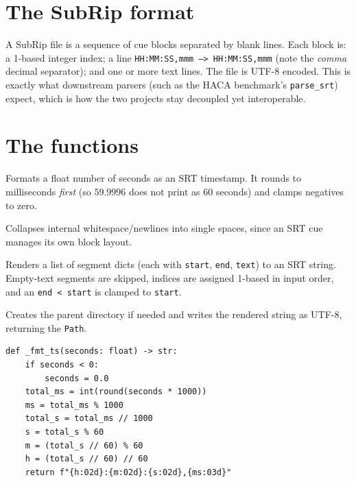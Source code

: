\documentclass[11pt,a4paper]{report}
\newcommand{\code}[1]{\texttt{\small #1}}
\begin{document}
\section{The SubRip format}

A SubRip file is a sequence of cue blocks separated by blank lines. Each block is:
a 1-based integer index; a line \code{HH:MM:SS,mmm --> HH:MM:SS,mmm} (note the
\emph{comma} decimal separator); and one or more text lines. The file is UTF-8
encoded. This is exactly what downstream parsers (such as the HACA benchmark's
\code{parse\_srt}) expect, which is how the two projects stay decoupled yet
interoperable.

\section{The functions}

\begin{description}[leftmargin=2em,style=nextline]
  \item[\texttt{\_fmt\_ts(seconds)}] Formats a float number of seconds as an SRT
        timestamp. It rounds to milliseconds \emph{first} (so $59.9996$ does not
        print as 60 seconds) and clamps negatives to zero.
  \item[\texttt{\_clean\_text(text)}] Collapses internal whitespace/newlines into
        single spaces, since an SRT cue manages its own block layout.
  \item[\texttt{render\_srt(segments)}] Renders a list of segment dicts (each with
        \code{start}, \code{end}, \code{text}) to an SRT string. Empty-text
        segments are skipped, indices are assigned 1-based in input order, and an
        \code{end < start} is clamped to \code{start}.
  \item[\texttt{write\_srt(segments, path)}] Creates the parent directory if
        needed and writes the rendered string as UTF-8, returning the \code{Path}.
\end{description}

\begin{lstlisting}[caption={Timestamp formatting --- millisecond-first rounding.}]
def _fmt_ts(seconds: float) -> str:
    if seconds < 0:
        seconds = 0.0
    total_ms = int(round(seconds * 1000))
    ms = total_ms % 1000
    total_s = total_ms // 1000
    s = total_s % 60
    m = (total_s // 60) % 60
    h = (total_s // 60) // 60
    return f"{h:02d}:{m:02d}:{s:02d},{ms:03d}"
\end{lstlisting}
\end{document}
